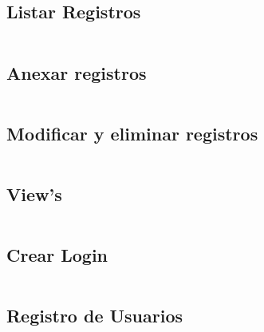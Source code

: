 \documentclass[xcolor=dvipsnames]{beamer}
\begin{document}
\subsection{Listar Registros}
\begin{frame}[fragile]
\begin{verbatim}

\end{verbatim}
\end{frame}

\subsection{Anexar registros}
\begin{frame}[fragile]
\begin{verbatim}

\end{verbatim}
\end{frame}

\subsection{Modificar y eliminar registros}
\begin{frame}[fragile]
\begin{verbatim}

\end{verbatim}
\end{frame}

\subsection{View's}
\begin{frame}[fragile]
\begin{verbatim}

\end{verbatim}
\end{frame}

\subsection{Crear Login}
\begin{frame}[fragile]
\begin{verbatim}

\end{verbatim}
\end{frame}

\subsection{Registro de Usuarios}
\begin{frame}[fragile]
\begin{verbatim}

\end{verbatim}
\end{frame}
\end{document}
